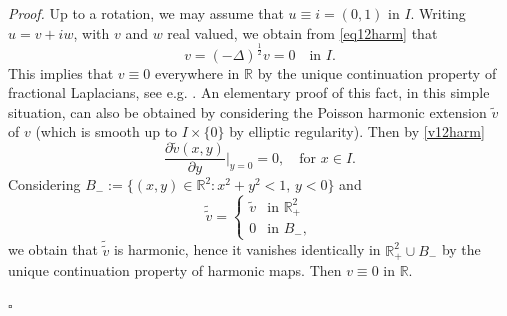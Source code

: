 \documentclass[12pt, a4paper]{article}
\newenvironment{proof}{\noindent\emph{Proof.}}{\hfill$\square$\medskip}
\newcommand{\de}{\partial}
\newcommand{\R}{\mathbb{R}}
\renewcommand{\(}{\left(}
\renewcommand{\)}{\right)}
\begin{document}
\begin{proof} Up to a rotation, we may assume that $u\equiv i=(0,1)$ in $I$. Writing $u=v+iw$, with $v$ and $w$ real valued, we obtain from \eqref{eq12harm} that
\begin{equation}\label{v12harm}
v=(-\Delta)^\frac12 v=0\quad \text{in }I.
\end{equation}
This implies that $v\equiv 0$ everywhere in $\R$ by the unique continuation property of fractional Laplacians, see e.g. \cite[Thm. 1.2]{GSU}. An elementary proof of this fact, in this simple situation, can also be obtained by considering the Poisson harmonic extension $\tilde v$ of $v$ (which is smooth up to $I\times \{0\}$ by elliptic regularity).
Then by \eqref{v12harm}
$$\frac{\de \tilde v(x,y)}{\de y}\bigg|_{y=0}=0,\quad \text{for }x\in I.$$
Considering $B_-:=\{(x,y)\in \R^2: x^2+y^2<1,\,y<0\}$ and
\[
\tilde{\tilde v}=\begin{cases}
\tilde v & \text{in }\R^2_+\\
0& \text{in }B_{-},
\end{cases}
\]
we obtain that $\tilde{\tilde v}$ is harmonic, hence it vanishes identically in $\R^2_+\cup B_-$ by the unique continuation property of harmonic maps. Then $v\equiv 0$ in $\R$.


\end{proof}
\end{document}
